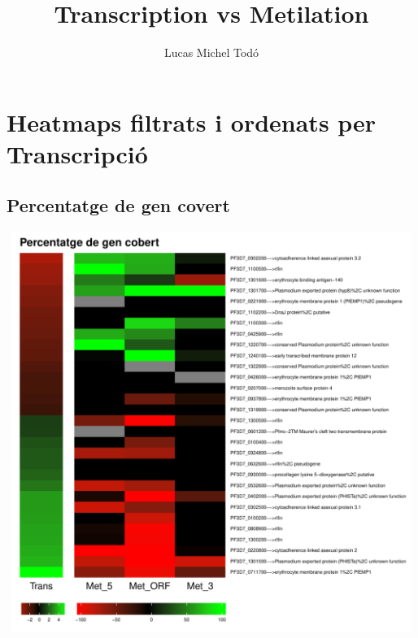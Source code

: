 \documentclass{article}\usepackage[]{graphicx}\usepackage[]{color}
\newenvironment{knitrout}{}{} %
\begin{document}
\title{Transcription vs Metilation}
\author{Lucas Michel Todó}
\maketitle
\tableofcontents
\clearpage









\section{Heatmaps filtrats i ordenats per Transcripció}
\subsection{Percentatge de gen covert}
\begin{knitrout}
\color{fgcolor}

{\centering \includegraphics[width=20cm,height=13cm]{figure/minimal-percentatge_nou-1} 

}



\end{knitrout}
\clearpage
\end{document}
